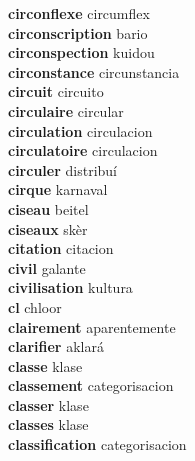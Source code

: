 \textbf{circonflexe } circumflex \\
\textbf{circonscription } bario \\
\textbf{circonspection } kuidou \\
\textbf{circonstance } circunstancia \\
\textbf{circuit } circuito \\
\textbf{circulaire } circular \\
\textbf{circulation } circulacion \\
\textbf{circulatoire } circulacion \\
\textbf{circuler } distribuí \\
\textbf{cirque } karnaval \\
\textbf{ciseau } beitel \\
\textbf{ciseaux } skèr \\
\textbf{citation } citacion \\
\textbf{civil } galante \\
\textbf{civilisation } kultura \\
\textbf{cl } chloor \\
\textbf{clairement } aparentemente \\
\textbf{clarifier } aklará \\
\textbf{classe } klase \\
\textbf{classement } categorisacion \\
\textbf{classer } klase \\
\textbf{classes } klase \\
\textbf{classification } categorisacion \\
